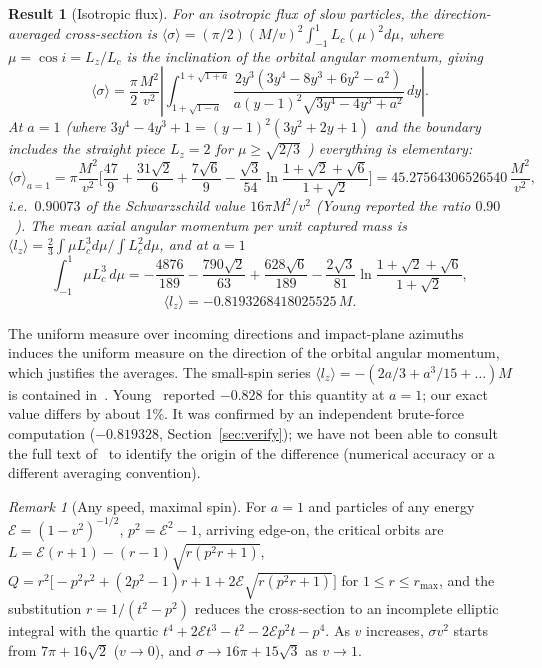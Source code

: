 \documentclass[11pt,a4paper]{article}
\newtheorem{result}{Result}
\theoremstyle{remark}
\newtheorem{remark}{Remark}
\numberwithin{equation}{section}
\begin{document}
\begin{result}[Isotropic flux]\label{res:iso}
For an isotropic flux of slow particles, the direction-averaged cross-section is
$\langle\sigma\rangle=(\pi/2)(M/v)^2\int_{-1}^{1}L_c(\mu)^2d\mu$, where $\mu=\cos i=L_z/L_c$ is the inclination of
the orbital angular momentum, giving
\begin{equation}
\langle\sigma\rangle=\frac{\pi}{2}\frac{M^2}{v^2}\left|\int_{1+\sqrt{1-a}}^{1+\sqrt{1+a}}
\frac{2y^3(3y^4-8y^3+6y^2-a^2)}{a(y-1)^2\sqrt{3y^4-4y^3+a^2}}\,dy\right| .
\end{equation}
At $a=1$ (where $3y^4-4y^3+1=(y-1)^2(3y^2+2y+1)$ and the boundary includes the straight piece $L_z=2$ for
$\mu\ge\sqrt{2/3}$~\cite{Will2012}) everything is elementary:
\begin{equation}
\langle\sigma\rangle_{a=1}=\pi\frac{M^2}{v^2}\Big[\frac{47}{9}+\frac{31\sqrt2}{6}+\frac{7\sqrt6}{9}
-\frac{\sqrt3}{54}\ln\frac{1+\sqrt2+\sqrt6}{1+\sqrt2}\Big]=45.27564306526540\,\frac{M^2}{v^2},
\end{equation}
i.e.\ $0.90073$ of the Schwarzschild value $16\pi M^2/v^2$ (Young reported the ratio $0.90$~\cite{Young1976}). The
mean axial angular momentum per unit captured mass is $\langle l_z\rangle=\frac23\int\mu L_c^3d\mu/\int L_c^2d\mu$, and at
$a=1$
\begin{equation}
\int_{-1}^{1}\mu L_c^3\,d\mu=-\frac{4876}{189}-\frac{790\sqrt2}{63}+\frac{628\sqrt6}{189}-\frac{2\sqrt3}{81}\ln\frac{1+\sqrt2+\sqrt6}{1+\sqrt2},
\end{equation}
\begin{equation}
\langle l_z\rangle=-0.8193268418025525\,M .
\end{equation}
\end{result}
The uniform measure over incoming directions and impact-plane azimuths induces the uniform measure on the
direction of the orbital angular momentum, which justifies the averages. The small-spin series
$\langle l_z\rangle=-(2a/3+a^3/15+\dots)M$ is contained in~\cite{MachMomenniaSarbach2026,MachMomenniaSarbach2026b}.
Young~\cite{Young1976} reported $-0.828$ for this quantity at $a=1$; our exact value differs by about 1\%. It was confirmed
by an independent brute-force computation ($-0.819328$, Section~\ref{sec:verify}); we have not been able to consult the full text
of~\cite{Young1976} to identify the origin of the difference (numerical accuracy or a different averaging convention).

\begin{remark}[Any speed, maximal spin]
For $a=1$ and particles of any energy $\mathcal E=(1-v^2)^{-1/2}$, $p^2=\mathcal E^2-1$, arriving edge-on, the critical orbits are
$L=\mathcal E(r+1)-(r-1)\sqrt{r(p^2r+1)}$, $Q=r^2\big[-p^2r^2+(2p^2-1)r+1+2\mathcal E\sqrt{r(p^2r+1)}\big]$ for $1\le r\le r_{\max}$, and the
substitution $r=1/(t^2-p^2)$ reduces the cross-section to an incomplete elliptic integral with the quartic
$t^4+2\mathcal Et^3-t^2-2\mathcal Ep^2t-p^4$. As $v$ increases, $\sigma v^2$ starts from $7\pi+16\sqrt2$ ($v\to0$), and $\sigma\to16\pi+15\sqrt3$ as $v\to1$.
\end{remark}
\end{document}

